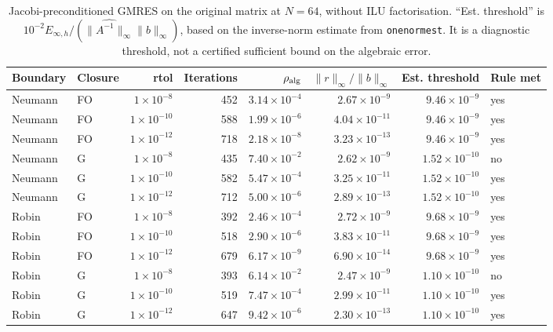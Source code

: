 \begin{table}[htbp]
\centering
\scriptsize
\setlength{\tabcolsep}{4pt}
\begin{tabular}{llrrrrrl}
\toprule
Boundary & Closure & rtol & Iterations & $\rho_{\rm alg}$ & $\|r\|_\infty/\|b\|_\infty$ & Est. threshold & Rule met \\
\midrule
Neumann & FO & $1\times10^{-8}$ & 452 & $3.14\times10^{-4}$ & $2.67\times10^{-9}$ & $9.46\times10^{-9}$ & yes \\
Neumann & FO & $1\times10^{-10}$ & 588 & $1.99\times10^{-6}$ & $4.04\times10^{-11}$ & $9.46\times10^{-9}$ & yes \\
Neumann & FO & $1\times10^{-12}$ & 718 & $2.18\times10^{-8}$ & $3.23\times10^{-13}$ & $9.46\times10^{-9}$ & yes \\
Neumann & G & $1\times10^{-8}$ & 435 & $7.40\times10^{-2}$ & $2.62\times10^{-9}$ & $1.52\times10^{-10}$ & no \\
Neumann & G & $1\times10^{-10}$ & 582 & $5.47\times10^{-4}$ & $3.25\times10^{-11}$ & $1.52\times10^{-10}$ & yes \\
Neumann & G & $1\times10^{-12}$ & 712 & $5.00\times10^{-6}$ & $2.89\times10^{-13}$ & $1.52\times10^{-10}$ & yes \\
Robin & FO & $1\times10^{-8}$ & 392 & $2.46\times10^{-4}$ & $2.72\times10^{-9}$ & $9.68\times10^{-9}$ & yes \\
Robin & FO & $1\times10^{-10}$ & 518 & $2.90\times10^{-6}$ & $3.83\times10^{-11}$ & $9.68\times10^{-9}$ & yes \\
Robin & FO & $1\times10^{-12}$ & 679 & $6.17\times10^{-9}$ & $6.90\times10^{-14}$ & $9.68\times10^{-9}$ & yes \\
Robin & G & $1\times10^{-8}$ & 393 & $6.14\times10^{-2}$ & $2.47\times10^{-9}$ & $1.10\times10^{-10}$ & no \\
Robin & G & $1\times10^{-10}$ & 519 & $7.47\times10^{-4}$ & $2.99\times10^{-11}$ & $1.10\times10^{-10}$ & yes \\
Robin & G & $1\times10^{-12}$ & 647 & $9.42\times10^{-6}$ & $2.30\times10^{-13}$ & $1.10\times10^{-10}$ & yes \\
\bottomrule
\end{tabular}
\caption{Jacobi-preconditioned GMRES on the original matrix at $N=64$, without ILU factorisation. ``Est. threshold'' is $10^{-2}E_{\infty,h}/(\widehat{\|A^{-1}\|_\infty}\|b\|_\infty)$, based on the inverse-norm estimate from \texttt{onenormest}. It is a diagnostic threshold, not a certified sufficient bound on the algebraic error.}
\label{tab:weak-gmres}
\end{table}

